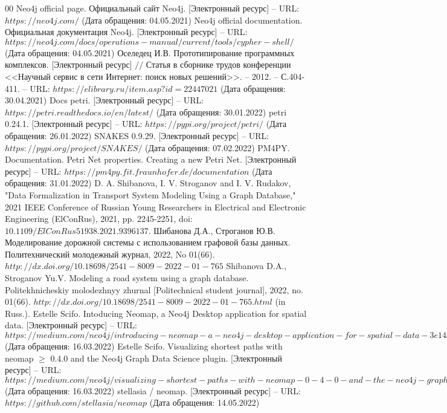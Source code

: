 \begin{thebibliography}{00}
	Neo4j official page. Официальный сайт Neo4j. [Электронный ресурс] -- URL: $https://neo4j.com/$ (Дата обращения: 04.05.2021)
	Neo4j official documentation. Официальная документация Neo4j. [Электронный ресурс] -- URL: $https://neo4j.com/docs/operations-manual/current/tools/cypher-shell/$ (Дата обращения: 04.05.2021)
	Оселедец И.В. Прототипирование программных комплексов. [Электронный ресурс] $//$ Статья в сборнике трудов конференции <<Научный сервис в сети Интернет: поиск новых решений>>. -- 2012. -- С.404-411. -- URL: $https://elibrary.ru/item.asp?id=22447021$ (Дата обращения: 30.04.2021)
	Docs petri. [Электронный ресурс] -- URL: $https://petri.readthedocs.io/en/latest/$ (Дата обращения: 30.01.2022)
	petri 0.24.1. [Электронный ресурс] -- URL: $https://pypi.org/project/petri/$ (Дата обращения: 26.01.2022)
	SNAKES 0.9.29. [Электронный ресурс] -- URL: $https://pypi.org/project/SNAKES/$ (Дата обращения: 07.02.2022)
	PM4PY. Documentation. Petri Net properties. Creating a new Petri Net. [Электронный ресурс] -- URL: $https://pm4py.fit.fraunhofer.de/documentation$ (Дата обращения: 31.01.2022)
	D. A. Shibanova, I. V. Stroganov and I. V. Rudakov, "Data Formalization in Transport System Modeling Using a Graph Database," 2021 IEEE Conference of Russian Young Researchers in Electrical and Electronic Engineering (ElConRus), 2021, pp. 2245-2251, doi: $10.1109/ElConRus51938.2021.9396137$.
	Шибанова Д.А., Строганов Ю.В. Моделирование дорожной системы с использованием графовой базы данных. Политехнический молодежный журнал, 2022, No 01(66). $http://dx.doi.org/10.18698/2541-8009-2022-01-765$ Shibanova D.A., Stroganov Yu.V. Modeling a road system using a graph database. Politekhnicheskiy molodezhnyy zhurnal [Politechnical student journal], 2022, no. 01(66). $http://dx.doi.org/10.18698/2541-8009-2022-01-765.html$ (in Russ.).
	Estelle Scifo. Intoducing Neomap, a Neo4j Desktop application for spatial data. [Электронный ресурс] -- URL: $https://medium.com/neo4j/introducing-neomap-a-neo4j-desktop-application-for-spatial-data-3e14aad59db2$ (Дата обращения: 16.03.2022)
	Estelle Scifo. Visualizing shortest paths with neomap $\geq$ 0.4.0 and the Neo4j Graph Data Science plugin. [Электронный ресурс] -- URL: $https://medium.com/neo4j/visualizing-shortest-paths-with-neomap-0-4-0-and-the-neo4j-graph-data-science-plugin-18db92f680de$ (Дата обращения: 16.03.2022)
	stellasia / neomap. [Электронный ресурс] -- URL: $https://github.com/stellasia/neomap$ (Дата обращения: 14.05.2022)
\end{thebibliography}
